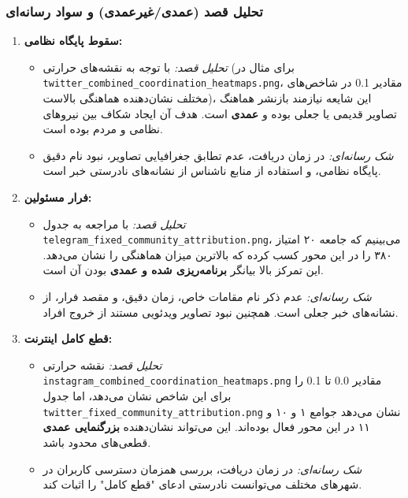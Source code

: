\documentclass{article}
\begin{document}
	\subsubsection*{تحلیل قصد (عمدی/غیرعمدی) و سواد رسانه‌ای}
	
	\begin{enumerate}
		\item \textbf{سقوط پایگاه نظامی:} 
		\begin{itemize}
			\item \textit{تحلیل قصد:} با توجه به نقشه‌های حرارتی (برای مثال در \texttt{twitter\_combined\_coordination\_heatmaps.png}، مقادیر 0.1 در شاخص‌های مختلف نشان‌دهنده هماهنگی بالاست)، این شایعه نیازمند بازنشر هماهنگ تصاویر قدیمی یا جعلی بوده و \textbf{عمدی} است. هدف آن ایجاد شکاف بین نیروهای نظامی و مردم بوده است.
			\item \textit{شک رسانه‌ای:} در زمان دریافت، عدم تطابق جغرافیایی تصاویر، نبود نام دقیق پایگاه نظامی، و استفاده از منابع ناشناس از نشانه‌های نادرستی خبر است.
		\end{itemize}
		
		\item \textbf{فرار مسئولین:}
		\begin{itemize}
			\item \textit{تحلیل قصد:} با مراجعه به جدول \texttt{telegram\_fixed\_community\_attribution.png}، می‌بینیم که جامعه ۲۰ امتیاز ۳۸۰ را در این محور کسب کرده که بالاترین میزان هماهنگی را نشان می‌دهد. این تمرکز بالا بیانگر \textbf{برنامه‌ریزی شده و عمدی} بودن آن است.
			\item \textit{شک رسانه‌ای:} عدم ذکر نام مقامات خاص، زمان دقیق، و مقصد فرار، از نشانه‌های خبر جعلی است. همچنین نبود تصاویر ویدئویی مستند از خروج افراد.
		\end{itemize}
		
		\item \textbf{قطع کامل اینترنت:}
		\begin{itemize}
			\item \textit{تحلیل قصد:} نقشه حرارتی \texttt{instagram\_combined\_coordination\_heatmaps.png} مقادیر 0.0 تا 0.1 را برای این شاخص نشان می‌دهد، اما جدول \texttt{twitter\_fixed\_community\_attribution.png} نشان می‌دهد جوامع ۱ و ۱۰ و ۱۱ در این محور فعال بوده‌اند. این می‌تواند نشان‌دهنده \textbf{بزرگنمایی عمدی} قطعی‌های محدود باشد.
			\item \textit{شک رسانه‌ای:} در زمان دریافت، بررسی همزمان دسترسی کاربران در شهرهای مختلف می‌توانست نادرستی ادعای "قطع کامل" را اثبات کند.
		\end{itemize}
		

\end{enumerate}
\end{document}
